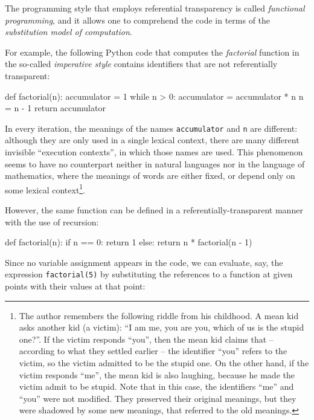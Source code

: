 The programming style that employs referential transparency
is called \emph{functional programming}, and it allows one to
comprehend the code in terms of the \emph{substitution model
  of computation}\cite{SICP}.

For example, the following Python code that computes the \emph{factorial}
function in the so-called \emph{imperative style} contains identifiers
that are not referentially transparent:

\begin{Snippet}
  def factorial(n):
      accumulator = 1 
      while n > 0:
          accumulator = accumulator * n
          n = n - 1
      return accumulator
\end{Snippet}

In every iteration, the meanings of the names \texttt{accumulator}
and \texttt{n} are different: although they are only used in a single
lexical context, there are many different invisible ``execution contexts'',
in which those names are used. This phenomenon seems to have no counterpart
neither in natural languages nor in the language of mathematics, where
the meanings of words are either fixed, or depend only on some lexical
context\footnote{The author remembers the following riddle from his
  childhood. A mean kid asks another kid (a victim): ``I am me, you are you,
  which of us is the stupid one?''. If the victim responds ``you'', then
  the mean kid claims that -- according to what they settled earlier -- the
  identifier ``you'' refers to the victim, so the victim admitted to
  be the stupid one. On the other hand, if the victim responds ``me'',
  the mean kid is also laughing, because he made the victim admit to
  be stupid.
  Note that in this case, the identifiers ``me'' and ``you'' were
  not modified. They preserved their original meanings, but they were
  shadowed by some new meanings, that referred to the old meanings.
}.

However, the same function can be defined in a referentially-transparent
manner with the use of recursion:

\begin{Snippet}
  def factorial(n):
      if n == 0:
          return 1
      else:
          return n * factorial(n - 1)
\end{Snippet}

Since no variable assignment appears in the code, we can evaluate, say,
the expression \texttt{factorial(5)} by substituting the references
to a function at given points with their values at that point:

